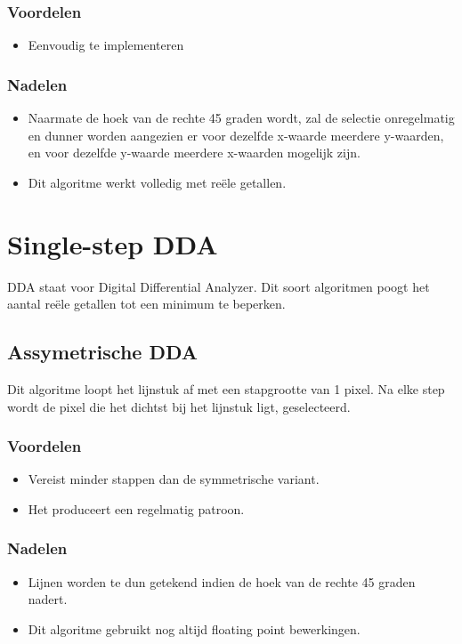 \documentclass{report}
\begin{document}
	\subsubsection{Voordelen}
	\begin{itemize}
		\item Eenvoudig te implementeren
	\end{itemize}
	\subsubsection{Nadelen}
	\begin{itemize}
		\item Naarmate de hoek van de rechte 45 graden wordt, zal de selectie onregelmatig en dunner worden aangezien er voor dezelfde x-waarde meerdere y-waarden, en voor dezelfde y-waarde meerdere x-waarden mogelijk zijn.
		\item Dit algoritme werkt volledig met reële getallen.
	\end{itemize}

	\section{Single-step DDA}
	DDA staat voor Digital Differential Analyzer. Dit soort algoritmen poogt het aantal reële getallen tot een minimum te beperken.
	\subsection{Assymetrische DDA}
	Dit algoritme loopt het lijnstuk af met een stapgrootte van 1 pixel. Na elke step wordt de pixel die het dichtst bij het lijnstuk ligt, geselecteerd.
	\subsubsection{Voordelen}
	\begin{itemize}
		\item Vereist minder stappen dan de symmetrische variant.
		\item Het produceert een regelmatig patroon.
	\end{itemize}
	\subsubsection{Nadelen}
	\begin{itemize}
		\item Lijnen worden te dun getekend indien de hoek van de rechte 45 graden nadert.
		\item Dit algoritme gebruikt nog altijd floating point bewerkingen.
	\end{itemize}
\end{document}
